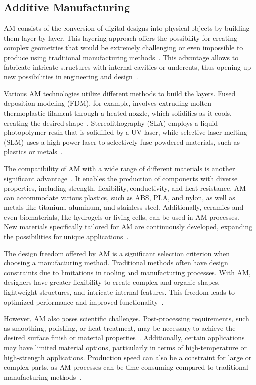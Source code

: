 \subsection{Additive Manufacturing}
\acrshort{AM} consists of the conversion of digital designs into physical objects by building them layer by layer. This layering approach offers the possibility for creating complex geometries that would be extremely challenging or even impossible to produce using traditional manufacturing methods~\cite{Prakash.2018}. This advantage allows to fabricate intricate structures with internal cavities or undercuts, thus opening up new possibilities in engineering and design~\cite{Abdulhameed.2019}.%

Various \acrshort{AM} technologies utilize different methods to build the layers. Fused deposition modeling (\acrshort{FDM}), for example, involves extruding molten thermoplastic filament through a heated nozzle, which solidifies as it cools, creating the desired shape~\cite{Wickramasinghe.2020}. Stereolithography (\acrshort{SLA}) employs a liquid photopolymer resin that is solidified by a UV laser, while selective laser melting (\acrshort{SLM}) uses a high-power laser to selectively fuse powdered materials, such as plastics or metals~\cite{Wang.2016, Meier.2017}.

The compatibility of \acrshort{AM} with a wide range of different materials is another significant advantage~\cite{Bose.2018}. It enables the production of components with diverse properties, including strength, flexibility, conductivity, and heat resistance. \acrshort{AM} can accommodate various plastics, such as ABS, PLA, and nylon, as well as metals like titanium, aluminum, and stainless steel. Additionally, ceramics and even biomaterials, like hydrogels or living cells, can be used in \acrshort{AM} processes. New materials specifically tailored for \acrshort{AM} are continuously developed,  expanding the possibilities for unique applications~\cite{Attaran.2017}.

The design freedom offered by \acrshort{AM} is a significant selection criterion when choosing a manufacturing method. Traditional methods often have design constraints due to limitations in tooling and manufacturing processes. With AM, designers have greater flexibility to create complex and organic shapes, lightweight structures, and intricate internal features. This freedom leads to optimized performance and improved functionality~\cite{Plocher.2019}.

However, \acrshort{AM} also poses scientific challenges. Post-processing requirements, such as smoothing, polishing, or heat treatment, may be necessary to achieve the desired surface finish or material properties~\cite{Jandyal.2022}. Additionally, certain applications may have limited material options, particularly in terms of high-temperature or high-strength applications. Production speed can also be a constraint for large or complex parts, as \acrshort{AM} processes can be time-consuming compared to traditional manufacturing methods~\cite{Dilberoglu.2017}.

